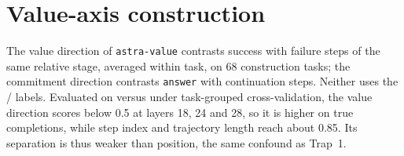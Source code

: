 \section{Value-axis construction}
\label{app:value}
The value direction of \texttt{astra-value} contrasts success with failure steps of the same relative stage, averaged within task, on 68 construction tasks; the commitment direction contrasts \texttt{answer} with continuation steps. Neither uses the \fsp/\fsm{} labels. Evaluated on \fsp{} versus \fsm{} under task-grouped cross-validation, the value direction scores below 0.5 at layers 18, 24 and 28, so it is higher on true completions, while step index and trajectory length reach about 0.85. %
Its separation is thus weaker than position, the same confound as Trap~1.
\FloatBarrier
